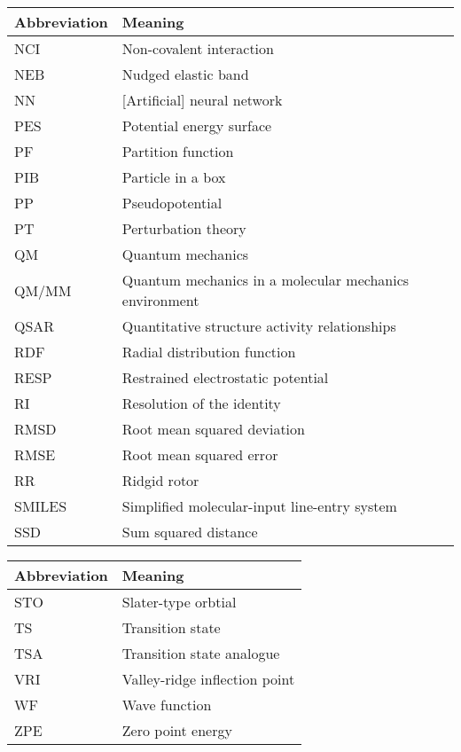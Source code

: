\documentclass[../main.tex]{subfiles}
\begin{document}
\begin{table}[h!]
\def\arraystretch{2.0}
\begin{tabularx}{\textwidth}{YY}
Abbreviation & Meaning \\
\hline
NCI	&	Non-covalent interaction	\\
NEB	&	Nudged elastic band	\\
NN	&	[Artificial] neural network	\\
PES	&	Potential energy surface	\\
PF	&	Partition function	\\
PIB	&	Particle in a box	\\
PP	&	Pseudopotential	\\
PT	&	Perturbation theory	\\
QM	&	Quantum mechanics	\\
QM/MM	&	Quantum mechanics in a molecular mechanics environment	\\
QSAR	&	Quantitative structure activity relationships	\\
RDF	&	Radial distribution function	\\
RESP	&	Restrained electrostatic potential	\\
RI	&	Resolution of the identity	\\
RMSD	&	Root mean squared deviation	\\
RMSE	&	Root mean squared error	\\
RR	&	Ridgid rotor	\\
SMILES	&	Simplified molecular-input line-entry system	\\
SSD	&	Sum squared distance	\\
\end{tabularx}
\end{table}
\newpage
\begin{table}[h!]
\def\arraystretch{2.0}
\begin{tabularx}{\textwidth}{YY}
Abbreviation & Meaning \\
\hline
STO	&	Slater-type orbtial	\\
TS	&	Transition state	\\
TSA	&	Transition state analogue	\\
VRI	&	Valley-ridge inflection point	\\
WF	&	Wave function	\\
ZPE	&	Zero point energy	\\
\end{tabularx}
\end{table}
\clearpage
\end{document}
